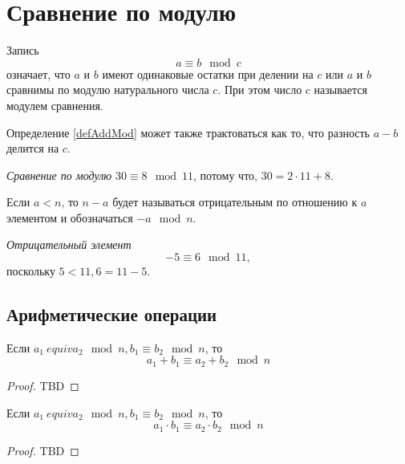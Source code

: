 \section{Сравнение по модулю}
\begin{definition}
Запись 
\begin{equation}
a \equiv b \mod{c}
\label{defAddMod}
\end{equation}
означает, что $a$ и $b$ имеют одинаковые остатки при делении на $c$
или $a$ и $b$ сравнимы по модулю натурального числа $c$. При этом
число $c$ называется модулем сравнения.
\end{definition}

Определение \ref{defAddMod} может также трактоваться как то, что
разность $a - b$ делится на $c$.

\begin{example}
\emph{Сравнение по модулю}
$30 \equiv 8 \mod{11}$, потому что, $30 = 2 \cdot 11 + 8$.
\end{example}

\begin{definition}
Если $a < n$, то $n - a$ будет называться отрицательным по отношению к
$a$ элементом и обозначаться $-a \mod n$.
\end{definition}

\begin{example}
\emph{Отрицательный элемент}
\[
-5 \equiv 6 \mod 11,
\]
поскольку $5 < 11, 6 = 11 - 5$.
\end{example}


\subsection{Арифметические операции}

\begin{lemma}
Если $a_1 \ equiv a_2 \mod n, b_1 \equiv b_2 \mod n$, то 
\[
a_1 + b_1 \equiv a_2 + b_2 \mod n
\]
\begin{proof}
TBD
\end{proof}
\end{lemma}

\begin{lemma}
Если $a_1 \ equiv a_2 \mod n, b_1 \equiv b_2 \mod n$, то 
\[
a_1 \cdot b_1 \equiv a_2 \cdot b_2 \mod n
\]
\begin{proof}
TBD
\end{proof}
\end{lemma}

